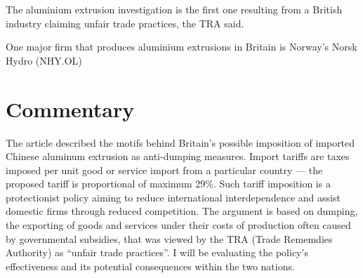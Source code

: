 \documentclass[a4paper,12pt]{article}
\begin{document}
The aluminium extrusion investigation is the first one resulting from a British industry claiming unfair trade practices, the TRA said.

One major firm that produces aluminium extrusions in Britain is Norway's Norsk Hydro (NHY.OL)

\newpage
\section*{Commentary}


The article described the motifs behind Britain's possible imposition of imported Chinese aluminum extrusion as anti-dumping measures. Import tariffs are taxes imposed per unit good or service import from a particular country --- the proposed tariff is proportional of maximum 29\%. Such tariff imposition is a protectionist policy aiming to reduce international interdependence and assist domestic firms through reduced competition. The argument is based on dumping, the exporting of goods and services under their costs of production often caused by governmental subsidies, that was viewed by the TRA (Trade Rememdies Authority) as ``unfair trade practices''. I will be evaluating the policy's effectiveness and its potential consequences within the two nations.






\end{document}
